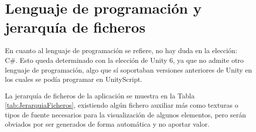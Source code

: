 \section{Lenguaje de programación y jerarquía de ficheros}
\label{sec:LenguajeProgramacionJerarquiaFicheros}

En cuanto al lenguaje de programación se refiere, no hay duda en la elección: C\#. Esto queda determinado con la elección de Unity 6, ya que no admite otro lenguaje de programación, algo que sí soportaban versiones anteriores de Unity en los cuales se podía programar en UnityScript.%

La jerarquía de ficheros de la aplicación se muestra en la Tabla \ref{tab:JerarquiaFicheros}, existiendo algún fichero auxiliar más como texturas o tipos de fuente necesarios para la visualización de algunos elementos, pero serán obviados por ser generados de forma automática y no aportar valor.

\vspace{-0.2cm}

\begin{table}[!hbtp]
	\caption{Jerarquía de ficheros de la aplicación.}
	\label{tab:JerarquiaFicheros}
\end{table}

\vspace{-0.8cm}

